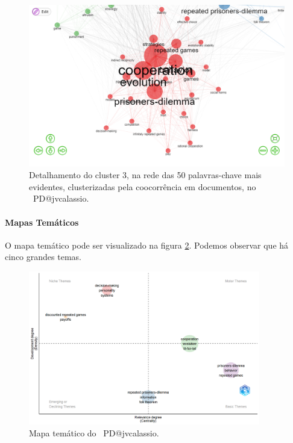 \begin{figure}
    \centering
    \includegraphics[width=1\textwidth]{exploratory-data-analysis/jvcalassio/PesqBibliogr/PrisonersDilemma/WoS-20221201/Dataset/Cluster3-Co-occurrence-Network-2022-12-03.png}
    \caption{Detalhamento do cluster 3, na rede das 50 palavras-chave mais evidentes, clusterizadas pela coocorrência em documentos, no  \dataset\ PD@jvcalassio.}
    \label{fig:PD@jvcalassio:Co-occurrence-Network:Cluster3}
\end{figure}

\paragraph{Mapas Temáticos}

O mapa temático pode ser visualizado na figura \ref{fig:PD@jvcalassio:ThematicMap}. Podemos observar que há cinco grandes temas.

\begin{figure}
    \centering
    \includegraphics[width=0.9\textwidth]{exploratory-data-analysis/jvcalassio/PesqBibliogr/PrisonersDilemma/WoS-20221201/Dataset/ThematicMap-2022-12-03.png}
    \caption{Mapa temático do  \dataset\ PD@jvcalassio.}
    \label{fig:PD@jvcalassio:ThematicMap}
\end{figure}

